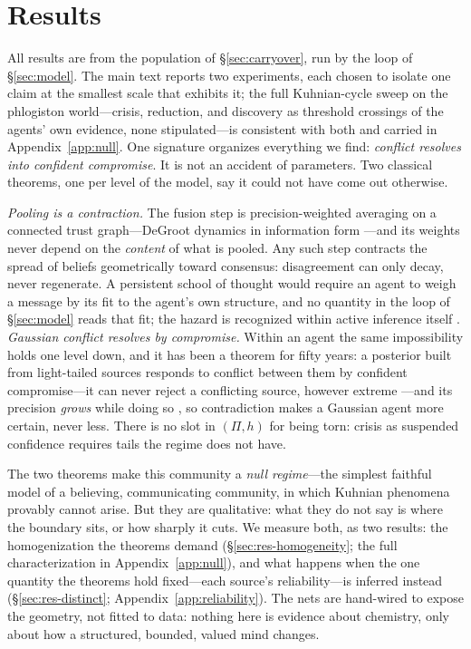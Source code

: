 \documentclass[runningheads]{llncs}
\begin{document}
\section{Results}
\label{sec:results}

All results are from the population of \S\ref{sec:carryover}, run by the loop of
\S\ref{sec:model}. The main text reports two experiments, each chosen to isolate one claim at
the smallest scale that exhibits it; the full Kuhnian-cycle sweep on the phlogiston
world---crisis, reduction, and discovery as threshold crossings of the agents' own evidence,
none stipulated---is consistent with both and carried in Appendix~\ref{app:null}. One signature
organizes everything we find: \emph{conflict resolves into confident compromise}. It is not an
accident of parameters. Two classical theorems, one per level of the model, say it could not
have come out otherwise.

\emph{Pooling is a contraction.} The fusion step is precision-weighted averaging on a connected
trust graph---DeGroot dynamics in information form \citep{degroot1974}---and its weights never
depend on the \emph{content} of what is pooled. Any such step contracts the spread of beliefs
geometrically toward consensus: disagreement can only decay, never regenerate. A persistent
school of thought would require an agent to weigh a message by its fit to the agent's own
structure, and no quantity in the loop of \S\ref{sec:model} reads that fit; the hazard is
recognized within active inference itself \citep{catal2024}. \emph{Gaussian conflict resolves by
compromise.} Within an agent the same impossibility holds one level down, and it has been a
theorem for fifty years: a posterior built from light-tailed sources responds to conflict between
them by confident compromise---it can never reject a conflicting source, however extreme
\citep{dawid1973,ohagan1979}---and its precision \emph{grows} while doing so \citep{ohagan2012},
so contradiction makes a Gaussian agent more certain, never less. There is no slot in $(\Pi,h)$
for being torn: crisis as suspended confidence requires tails the regime does not have.

The two theorems make this community a \emph{null regime}---the simplest faithful model of a
believing, communicating community, in which Kuhnian phenomena provably cannot arise. But they
are qualitative: what they do not say is where the boundary sits, or how sharply it cuts. We
measure both, as two results: the homogenization the theorems demand
(\S\ref{sec:res-homogeneity}; the full characterization in Appendix~\ref{app:null}), and what
happens when the one quantity the theorems hold fixed---each source's reliability---is inferred
instead (\S\ref{sec:res-distinct}; Appendix~\ref{app:reliability}). The nets are
hand-wired to expose the geometry, not fitted to data: nothing here is evidence about chemistry,
only about how a structured, bounded, valued mind changes.
\end{document}
